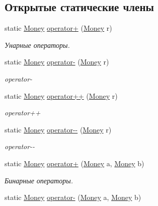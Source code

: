 \subsection*{Открытые статические члены}
\begin{DoxyCompactItemize}
\item 
static \mbox{\hyperlink{struct_f_b_a_1_1_money}{Money}} \mbox{\hyperlink{struct_f_b_a_1_1_money_aac56eddcf65384f01269e929db661c39}{operator+}} (\mbox{\hyperlink{struct_f_b_a_1_1_money}{Money}} r)
\begin{DoxyCompactList}\small\item\em Унарные операторы. \end{DoxyCompactList}\item 
static \mbox{\hyperlink{struct_f_b_a_1_1_money}{Money}} \mbox{\hyperlink{struct_f_b_a_1_1_money_a64164337f91a6ed7827f7b2275b7d2e1}{operator-\/}} (\mbox{\hyperlink{struct_f_b_a_1_1_money}{Money}} r)
\begin{DoxyCompactList}\small\item\em operator-\/ \end{DoxyCompactList}\item 
static \mbox{\hyperlink{struct_f_b_a_1_1_money}{Money}} \mbox{\hyperlink{struct_f_b_a_1_1_money_a37c9ebf2e52849c142606f8c2f9eb8ea}{operator++}} (\mbox{\hyperlink{struct_f_b_a_1_1_money}{Money}} r)
\begin{DoxyCompactList}\small\item\em operator++ \end{DoxyCompactList}\item 
static \mbox{\hyperlink{struct_f_b_a_1_1_money}{Money}} \mbox{\hyperlink{struct_f_b_a_1_1_money_aa989cd8c47a2d00ce8da9d548509e3c9}{operator-\/-\/}} (\mbox{\hyperlink{struct_f_b_a_1_1_money}{Money}} r)
\begin{DoxyCompactList}\small\item\em operator-\/-\/ \end{DoxyCompactList}\item 
static \mbox{\hyperlink{struct_f_b_a_1_1_money}{Money}} \mbox{\hyperlink{struct_f_b_a_1_1_money_a3320e7e7361f041f3e5cf86720276abc}{operator+}} (\mbox{\hyperlink{struct_f_b_a_1_1_money}{Money}} a, \mbox{\hyperlink{struct_f_b_a_1_1_money}{Money}} b)
\begin{DoxyCompactList}\small\item\em Бинарные операторы. \end{DoxyCompactList}\item 
static \mbox{\hyperlink{struct_f_b_a_1_1_money}{Money}} \mbox{\hyperlink{struct_f_b_a_1_1_money_a1ac5c8eb71a4d5b2cb37b87aea2d0c75}{operator-\/}} (\mbox{\hyperlink{struct_f_b_a_1_1_money}{Money}} a, \mbox{\hyperlink{struct_f_b_a_1_1_money}{Money}} b)

\end{DoxyCompactItemize}
